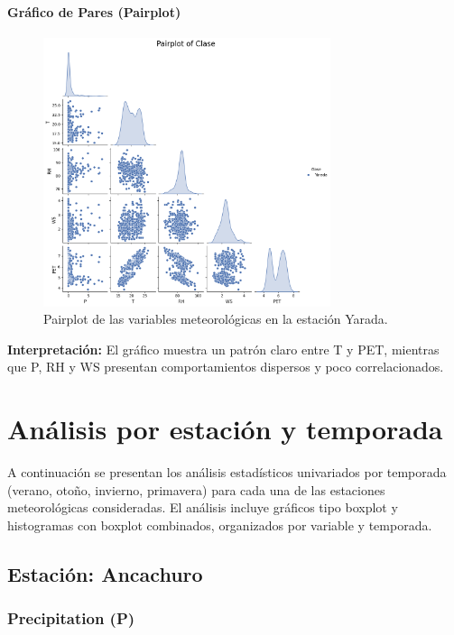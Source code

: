 \subsubsection*{Gráfico de Pares (Pairplot)}
\begin{figure}[htbp]
\centering
\includegraphics[width=0.75\textwidth]{resultados/por_estacion_meteorologica/Yarada/pairplot.png}
\caption{Pairplot de las variables meteorológicas en la estación Yarada.}
\label{fig:yarada_pairplot}
\end{figure}
\textbf{Interpretación:} El gráfico muestra un patrón claro entre T y PET, mientras que P, RH y WS presentan comportamientos dispersos y poco correlacionados.






\chapter{Análisis por estación y temporada}

A continuación se presentan los análisis estadísticos univariados por temporada (verano, otoño, invierno, primavera) para cada una de las estaciones meteorológicas consideradas. El análisis incluye gráficos tipo boxplot y histogramas con boxplot combinados, organizados por variable y temporada.

\section{Estación: Ancachuro}

\subsection{Precipitation (P)}

